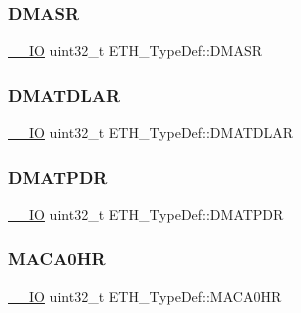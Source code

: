 \mbox{\label{struct_e_t_h___type_def_aa55a721ec8bb2239012aa7202e75abef}} 
\subsubsection{\texorpdfstring{DMASR}{DMASR}}
{\footnotesize\ttfamily \mbox{\hyperlink{group___c_m_s_i_s___c_m3__core__definitions_gaec43007d9998a0a0e01faede4133d6be}{\+\_\+\+\_\+\+IO}} uint32\+\_\+t E\+T\+H\+\_\+\+Type\+Def\+::\+D\+M\+A\+SR}

\mbox{\label{struct_e_t_h___type_def_a480a59fd0e4c6088a693fc8160831154}} 
\subsubsection{\texorpdfstring{DMATDLAR}{DMATDLAR}}
{\footnotesize\ttfamily \mbox{\hyperlink{group___c_m_s_i_s___c_m3__core__definitions_gaec43007d9998a0a0e01faede4133d6be}{\+\_\+\+\_\+\+IO}} uint32\+\_\+t E\+T\+H\+\_\+\+Type\+Def\+::\+D\+M\+A\+T\+D\+L\+AR}

\mbox{\label{struct_e_t_h___type_def_aab836646e2e03cde9af74e439e875403}} 
\subsubsection{\texorpdfstring{DMATPDR}{DMATPDR}}
{\footnotesize\ttfamily \mbox{\hyperlink{group___c_m_s_i_s___c_m3__core__definitions_gaec43007d9998a0a0e01faede4133d6be}{\+\_\+\+\_\+\+IO}} uint32\+\_\+t E\+T\+H\+\_\+\+Type\+Def\+::\+D\+M\+A\+T\+P\+DR}

\mbox{\label{struct_e_t_h___type_def_aee8d5fcb4edf8c156e70188d7ab24423}} 
\subsubsection{\texorpdfstring{MACA0HR}{MACA0HR}}
{\footnotesize\ttfamily \mbox{\hyperlink{group___c_m_s_i_s___c_m3__core__definitions_gaec43007d9998a0a0e01faede4133d6be}{\+\_\+\+\_\+\+IO}} uint32\+\_\+t E\+T\+H\+\_\+\+Type\+Def\+::\+M\+A\+C\+A0\+HR}

